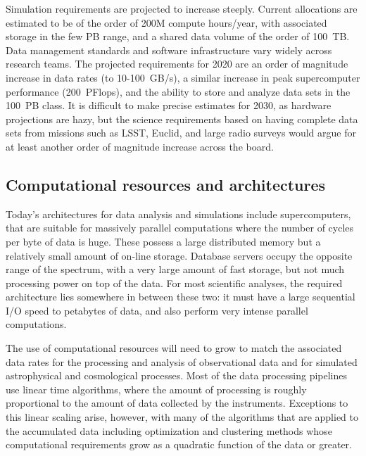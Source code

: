 Simulation requirements are projected to increase steeply. Current
allocations are estimated to be of the order of 200M compute
hours/year, with associated storage in the few PB range, and a shared
data volume of the order of 100~TB. Data management standards and
software infrastructure vary widely across research teams. The
projected requirements for 2020 are an order of magnitude increase
in data rates (to 10-100~GB/s), a similar increase in peak
supercomputer performance (200~PFlops), and the ability to store and
analyze data sets in the 100~PB class. It is difficult to make precise
estimates for 2030, as hardware projections are hazy, but the
science requirements based on having complete data sets from missions
such as LSST, Euclid, and large radio surveys would argue for at least
another order of magnitude increase across the board.

\subsection{Computational resources and architectures}
Today's architectures for data analysis and simulations include supercomputers, 
that are suitable for massively parallel computations where the number of 
cycles per byte of data is huge.  These possess a large distributed memory 
but a relatively small amount of on-line storage.
Database servers occupy the opposite range of the spectrum,
with a very large amount of fast storage, but not much processing
power on top of the data. For most scientific analyses, the required
architecture lies somewhere in between these two: it must have a large
sequential I/O speed to petabytes of data, and also perform very
intense parallel computations. 

The use of computational resources will need to grow to match the
associated data rates for the processing and analysis of observational
data and for simulated astrophysical and cosmological processes. Most
of the data processing pipelines use linear time algorithms, where the
amount of processing is roughly proportional to the amount of data
collected by the instruments.  Exceptions to this linear scaling arise, however,
with many of the algorithms that are applied to the accumulated data
including optimization and clustering methods whose computational requirements
grow as a quadratic function of the data or greater.


